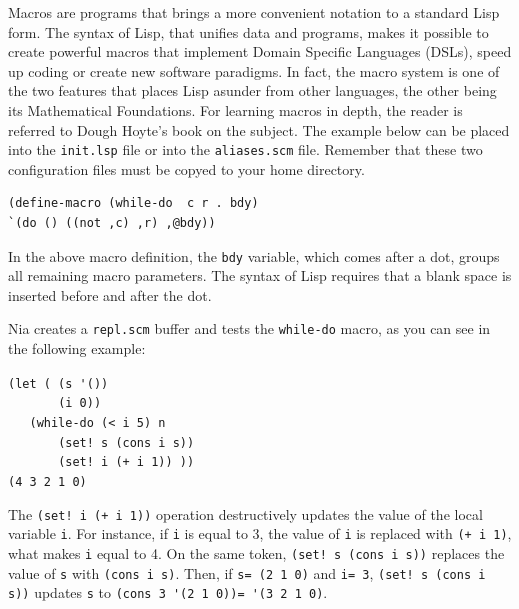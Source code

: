 \documentclass[a4paper,12pt]{book}
\newenvironment{fmpage}[1]
           {\begin{lrbox}{\fmbox}\begin{minipage}{#1}}
           {\end{minipage}\end{lrbox}\fbox{\usebox{\fmbox}}}
\begin{document}
Macros are programs that brings a more convenient
notation to a standard Lisp form. The syntax of Lisp,
that unifies data and programs, makes it possible to
create powerful macros that implement Domain Specific
Languages (DSLs), speed up coding or create new software
paradigms. In fact, the macro system is one of the
two features that places Lisp asunder from other
languages, the other being its Mathematical Foundations.
For learning macros in depth, the reader is referred to
Dough Hoyte's book on the subject\cite{Hoyte}.
The example below can be placed into the
\verb|init.lsp| file or into the \verb|aliases.scm|
file. Remember that these two configuration
files must be copyed to your home directory.

\begin{verbatim}
(define-macro (while-do  c r . bdy)
`(do () ((not ,c) ,r) ,@bdy))
\end{verbatim}

In the above macro definition,
the  \verb|bdy| variable, which
comes after a dot, groups all
remaining macro parameters.
The syntax of Lisp requires that
a blank space is inserted before
and after the dot.

Nia creates a \verb|repl.scm| buffer
and tests the \verb|while-do| macro,
as you can see in the following example:\\

\begin{fmpage}{0.8\linewidth}
\verb|(let ( (s '())|\\
\verb|       (i 0))|\\
\verb|   (while-do (< i 5) n|\\
\verb|       (set! s (cons i s))|\\
\verb|       (set! i (+ i 1)) ))| \keys{~]~}\\
\verb|(4 3 2 1 0)|\\
\end{fmpage}

\begin{fmpage}{0.8\linewidth}
\verb||
\end{fmpage}

\vspace{0.5cm}
The \verb|(set! i (+ i 1))| operation
destructively updates the value
of the local variable \verb|i|.
For instance, if \verb|i| is
equal to 3, the value of \verb|i|
is replaced with \verb|(+ i 1)|,
what makes \verb|i| equal to 4.
On the same token, \verb|(set! s (cons i s))|
replaces the value of \verb|s| with
\verb|(cons i s)|. Then, if \verb|s= (2 1 0)|
and \verb|i= 3|,
\verb|(set! s (cons i s))| updates \verb|s|
to \verb|(cons 3 '(2 1 0))= '(3 2 1 0)|.
\end{document}
